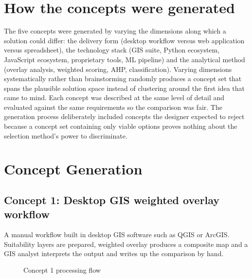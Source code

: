 \documentclass[12pt,a4paper]{report}
\begin{document}
\section{How the concepts were generated}
The five concepts were generated by varying the dimensions along which
a solution could differ: the delivery form (desktop workflow versus
web application versus spreadsheet), the technology stack (GIS suite,
Python ecosystem, JavaScript ecosystem, proprietary tools, ML
pipeline) and the analytical method (overlay analysis, weighted
scoring, AHP, classification). Varying dimensions systematically
rather than brainstorming randomly produces a concept set that spans
the plausible solution space instead of clustering around the first
idea that came to mind. Each concept was described at the same level
of detail and evaluated against the same requirements so the
comparison was fair. The generation process deliberately included
concepts the designer expected to reject because a concept set
containing only viable options proves nothing about the selection
method's power to discriminate.

\section{Concept Generation}

\subsection{Concept 1: Desktop GIS weighted overlay workflow}
A manual workflow built in desktop GIS software such as QGIS or ArcGIS.
Suitability layers are prepared, weighted overlay produces a composite
map and a GIS analyst interprets the output and writes up the
comparison by hand.

\begin{figure}[h]
\centering
{}
\caption{Concept 1 processing flow}
\end{figure}
\end{document}
